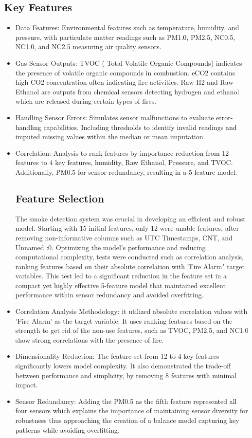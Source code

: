 \documentclass[conference]{IEEEtran}
\begin{document}
\subsection{Key Features}
\begin{itemize}
\item Data Features: Environmental features such as
temperature, humidity, and pressure, with particulate matter
readings such as PM1.0, PM2.5, NC0.5, NC1.0, and NC2.5
measuring air quality sensors. 
\item Gas Sensor Outputs: TVOC ( Total Volatile Organic
Compounds)  indicates the presence of volatile organic
compounds in combustion. eCO2 contains high CO2
concentration often indicating fire activities. Raw H2 and
Raw Ethanol are outputs from chemical sensors detecting
hydrogen and ethanol which are released during certain types
of fires.  
\item Handling Sensor Errors: Simulates sensor malfunctions
to evaluate error-handling capabilities. Including
thresholds to identify invalid readings and imputed missing
values within the median or mean imputation. 
\item Correlation: Analysis to rank features by importance
reduction from 12 features to 4 key features, humidity, Raw
Ethanol, Pressure, and TVOC. Additionally, PM0.5 for sensor
redundancy, resulting in a 5-feature model.

\subsection{Feature Selection}
The smoke detection system was crucial in developing an
efficient and robust model. Starting with 15 initial
features, only 12 were unable features, after removing
non-informative columns such as UTC Timestamps, CNT, and
Unnamed :0. Optimizing the model's performance and reducing
computational complexity, tests were conducted such as
correlation analysis, ranking features based on their
absolute correlation with 'Fire Alarm" target variables.
This test led to a significant reduction in the feature set
in a compact yet highly effective 5-feature model that
maintained excellent performance within sensor redundancy
and avoided overfitting. 
\item Correlation Analysis Methodology: it utilized absolute
correlation values with 'Fire Alarm' as the target variable.
It uses ranking features based on the strength to get rid of
the non-use features, such as TVOC, PM2.5, and NC1.0 show
strong correlations with the presence of fire. 
\item Dimensionality Reduction: The feature set from 12 to 4
key features significantly lowers model complexity. It also
demonstrated the trade-off between performance and
simplicity, by removing 8 features with minimal impact. 
\item Sensor Redundancy: Adding the PM0.5 as the fifth
feature represented all four sensors which explains the
importance of maintaining sensor diversity for robustness
thus approaching the creation of a balance model capturing
key patterns while avoiding overfitting. 
\end{itemize}
\end{document}
